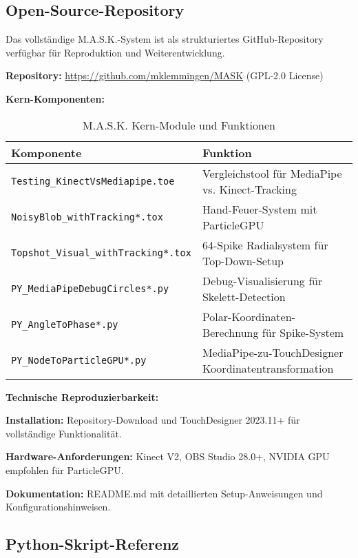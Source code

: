 \subsection{Open-Source-Repository}

Das vollständige M.A.S.K.-System ist als strukturiertes GitHub-Repository verfügbar für Reproduktion und Weiterentwicklung.

\textbf{Repository:} \url{https://github.com/mklemmingen/MASK} (GPL-2.0 License)

\textbf{Kern-Komponenten:}

\begin{table}[H]
    \centering
    \begin{tabular}{|l|p{8cm}|}
        \hline
        \textbf{Komponente} & \textbf{Funktion} \\ \hline
        \texttt{Testing\_KinectVsMediapipe.toe} & Vergleichstool für MediaPipe vs. Kinect-Tracking \\ \hline
        \texttt{NoisyBlob\_withTracking*.tox} & Hand-Feuer-System mit ParticleGPU \\ \hline
        \texttt{Topshot\_Visual\_withTracking*.tox} & 64-Spike Radialsystem für Top-Down-Setup \\ \hline
        \texttt{PY\_MediaPipeDebugCircles*.py} & Debug-Visualisierung für Skelett-Detection \\ \hline
        \texttt{PY\_AngleToPhase*.py} & Polar-Koordinaten-Berechnung für Spike-System \\ \hline
        \texttt{PY\_NodeToParticleGPU*.py} & MediaPipe-zu-TouchDesigner Koordinatentransformation \\ \hline
    \end{tabular}
    \caption{M.A.S.K. Kern-Module und Funktionen}
    \label{tab:core_modules}
\end{table}

\textbf{Technische Reproduzierbarkeit:}

\textbf{Installation:} Repository-Download und TouchDesigner 2023.11+ für vollständige Funktionalität.

\textbf{Hardware-Anforderungen:} Kinect V2, OBS Studio 28.0+, NVIDIA GPU empfohlen für ParticleGPU.

\textbf{Dokumentation:} README.md mit detaillierten Setup-Anweisungen und Konfigurationshinweisen.

\subsection{Python-Skript-Referenz}

